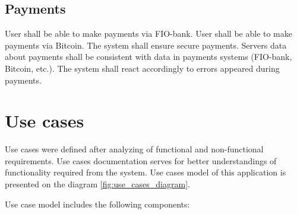 \subsection*{Payments}
\begin{itemize}
User shall be able to make payments via FIO-bank.
User shall be able to make payments via Bitcoin.
The system shall ensure secure payments.
Servers data about payments shall be consistent with data in payments systems (FIO-bank, Bitcoin, etc.). The system
shall react accordingly to errors appeared during payments.
\end{itemize}



\newcommand{\uccomponent}[1]{
\item \textbf{#1}
}
\newcommand{\ucactor}[1]{
\item \textbf{#1}
}
\newcommand{\ucgroup}[1]{
\item \textbf{#1}
}
\section{Use cases}
Use cases were defined after analyzing of functional and non-functional requirements. Use cases documentation serves for
better understandings of functionality required from the system. Use cases model of this application is presented on
the diagram \ref{fig:use_cases_diagram}.


Use case model includes the following components:

